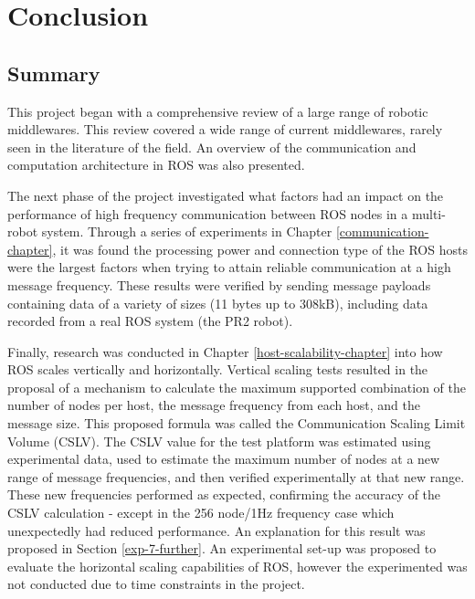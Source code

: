 \documentclass[../dissertation.tex]{subfiles}
\begin{document}
\chapter{Conclusion}
\label{conclusion-chapter}

\section{Summary}





This project began with a comprehensive review of a large range of robotic middlewares. This review covered a wide range of current middlewares, rarely seen in the literature of the field. An overview of the communication and computation architecture in ROS was also presented.

The next phase of the project investigated what factors had an impact on the performance of high frequency communication between ROS nodes in a multi-robot system. Through a series of experiments in Chapter \ref{communication-chapter}, it was found the processing power and connection type of the ROS hosts were the largest factors when trying to attain reliable communication at a high message frequency. These results were verified by sending message payloads containing data of a variety of sizes (11 bytes up to 308kB), including data recorded from a real ROS system (the PR2 robot).

Finally, research was conducted in Chapter \ref{host-scalability-chapter} into how ROS scales vertically and horizontally. Vertical scaling tests resulted in the proposal of a mechanism to calculate the maximum supported combination of the number of nodes per host, the message frequency from each host, and the message size. This proposed formula was called the Communication Scaling Limit Volume (CSLV). The CSLV value for the test platform was estimated using experimental data, used to estimate the maximum number of nodes at a new range of message frequencies, and then verified experimentally at that new range. These new frequencies performed as expected, confirming the accuracy of the CSLV calculation - except in the 256 node/1Hz frequency case which unexpectedly had reduced performance. An explanation for this result was proposed in Section \ref{exp-7-further}. An experimental set-up was proposed to evaluate the horizontal scaling capabilities of ROS, however the experimented was not conducted due to time constraints in the project.
\end{document}
